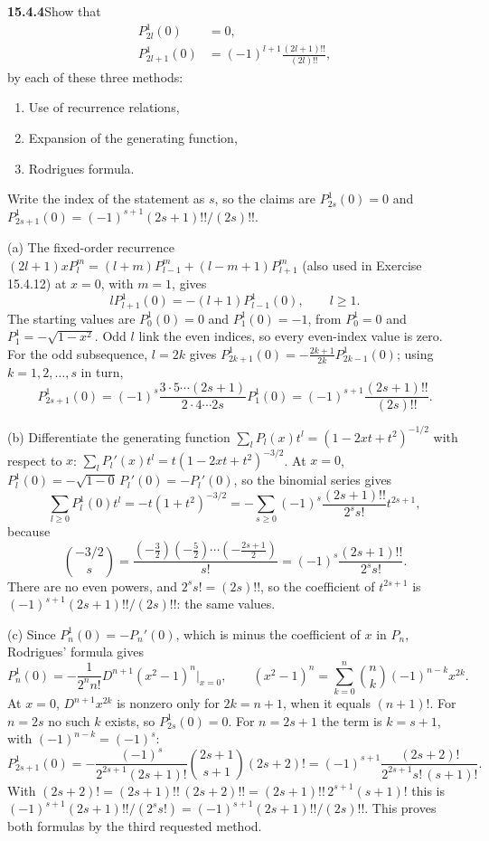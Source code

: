 \par\bigskip
\noindent\textbf{15.4.4}\quad Show that
\begin{align*}
P_{2l}^{1}(0)&=0,\\
P_{2l+1}^{1}(0)&=(-1)^{l+1}\frac{(2l+1)!!}{(2l)!!},
\end{align*}
by each of these three methods:
\begin{enumerate}
\item[(a)] Use of recurrence relations,
\item[(b)] Expansion of the generating function,
\item[(c)] Rodrigues formula.
\end{enumerate}
\solution
Write the index of the statement as $s$, so the claims are
$P_{2s}^1(0)=0$ and $P_{2s+1}^1(0)=(-1)^{s+1}(2s+1)!!/(2s)!!$.

(a) The fixed-order recurrence
$(2l+1)xP_l^m=(l+m)P_{l-1}^m+(l-m+1)P_{l+1}^m$ (also used in
Exercise 15.4.12) at $x=0$, with $m=1$, gives
\[
lP_{l+1}^1(0)=-(l+1)P_{l-1}^1(0),\qquad l\ge1.
\]
The starting values are $P_0^1(0)=0$ and $P_1^1(0)=-1$, from
$P_0^1=0$ and $P_1^1=-\sqrt{1-x^2}$.
Odd $l$ link the even indices, so every even-index value is zero.
For the odd subsequence, $l=2k$ gives
$P_{2k+1}^1(0)=-\frac{2k+1}{2k}P_{2k-1}^1(0)$; using
$k=1,2,\ldots,s$ in turn,
\[
P_{2s+1}^1(0)=(-1)^s\frac{3\cdot5\cdots(2s+1)}
{2\cdot4\cdots2s}P_1^1(0)
=\boxed{(-1)^{s+1}\frac{(2s+1)!!}{(2s)!!}}.
\]

(b) Differentiate the generating function
$\sum_lP_l(x)t^l=(1-2xt+t^2)^{-1/2}$ with respect to $x$:
$\sum_lP_l'(x)t^l=t(1-2xt+t^2)^{-3/2}$. At $x=0$,
$P_l^1(0)=-\sqrt{1-0}\,P_l'(0)=-P_l'(0)$, so the binomial series
gives
\[
\sum_{l\ge0}P_l^1(0)t^l=-t(1+t^2)^{-3/2}
=-\sum_{s\ge0}(-1)^s\frac{(2s+1)!!}{2^ss!}t^{2s+1},
\]
because
\[
\binom{-3/2}{s}=\frac{(-\frac32)(-\frac52)\cdots(-\frac{2s+1}2)}{s!}
=(-1)^s\frac{(2s+1)!!}{2^ss!}.
\]
There are no even powers, and $2^ss!=(2s)!!$, so the coefficient of
$t^{2s+1}$ is $(-1)^{s+1}(2s+1)!!/(2s)!!$: the same values.

(c) Since $P_n^1(0)=-P_n'(0)$, which is minus the coefficient of $x$
in $P_n$, Rodrigues' formula gives
\[
P_n^1(0)=-\frac1{2^nn!}D^{n+1}(x^2-1)^n\Big|_{x=0},\qquad
(x^2-1)^n=\sum_{k=0}^n\binom nk(-1)^{n-k}x^{2k}.
\]
At $x=0$, $D^{n+1}x^{2k}$ is nonzero only for $2k=n+1$, when it equals
$(n+1)!$. For $n=2s$ no such $k$ exists, so $P_{2s}^1(0)=0$. For
$n=2s+1$ the term is $k=s+1$, with $(-1)^{n-k}=(-1)^s$:
\[
P_{2s+1}^1(0)=-\frac{(-1)^s}{2^{2s+1}(2s+1)!}
\binom{2s+1}{s+1}(2s+2)!
=(-1)^{s+1}\frac{(2s+2)!}{2^{2s+1}s!\,(s+1)!}.
\]
With $(2s+2)!=(2s+1)!!\,(2s+2)!!=(2s+1)!!\,2^{s+1}(s+1)!$ this is
$(-1)^{s+1}(2s+1)!!/(2^ss!)=(-1)^{s+1}(2s+1)!!/(2s)!!$.
This proves both formulas by the third requested method.

